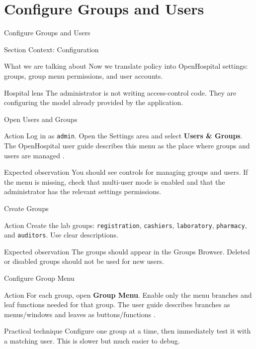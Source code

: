 \documentclass[presentation]{beamer}
\newcommand{\sectiontitleframe}[1]{
\begin{frame}[plain,c]
\begin{center}
{\usebeamerfont{title}\usebeamercolor[fg]{title}#1}
\end{center}
\end{frame}
}
\begin{document}
\section{Configure Groups and Users}
\sectiontitleframe{Configure Groups and Users}

\begin{frame}[c]{Section Context: Configuration}
\begin{block}{What we are talking about}
Now we translate policy into OpenHospital settings: groups, group menu permissions, and user
accounts.
\end{block}

\begin{exampleblock}{Hospital lens}
The administrator is not writing access-control code. They are configuring the model already
provided by the application.
\end{exampleblock}
\end{frame}

\begin{frame}[c]{Open Users and Groups}
\begin{block}{Action}
Log in as \texttt{admin}. Open the Settings area and select \textbf{Users \& Groups}. The
OpenHospital user guide describes this menu as the place where groups and users are managed
\cite{openhospital_user}.
\end{block}

\begin{exampleblock}{Expected observation}
You should see controls for managing groups and users. If the menu is missing, check that multi-user
mode is enabled and that the administrator has the relevant settings permissions.
\end{exampleblock}
\end{frame}

\begin{frame}[c]{Create Groups}
\begin{block}{Action}
Create the lab groups: \texttt{registration}, \texttt{cashiers}, \texttt{laboratory},
\texttt{pharmacy}, and \texttt{auditors}. Use clear descriptions.
\end{block}

\begin{exampleblock}{Expected observation}
The groups should appear in the Groups Browser. Deleted or disabled groups should not be used for
new users.
\end{exampleblock}
\end{frame}

\begin{frame}[c]{Configure Group Menu}
\begin{block}{Action}
For each group, open \textbf{Group Menu}. Enable only the menu branches and leaf functions needed
for that group. The user guide describes branches as menus/windows and leaves as buttons/functions
\cite{openhospital_user}.
\end{block}

\begin{exampleblock}{Practical technique}
Configure one group at a time, then immediately test it with a matching user. This is slower but
much easier to debug.
\end{exampleblock}
\end{frame}
\end{document}
